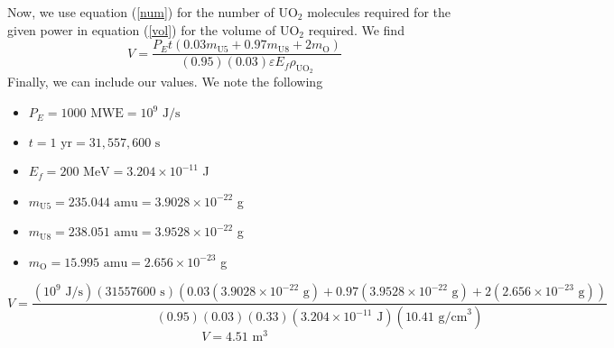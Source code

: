 Now, we use equation (\ref{num}) for the number of UO$_2$ molecules required for the given power in equation (\ref{vol}) for the volume of UO$_2$ required. We find
$$ V = \frac{P_E t(0.03m_{\text{U5}} + 0.97m_{\text{U8}} + 2 m_{\text{O}})}{(0.95)(0.03)\varepsilon E_f\rho_{\text{UO}_2}} $$
Finally, we can include our values. We note the following
\begin{itemize}
\item $P_E = 1000\text{ MWE} = 10^9\text{ J/s}$
\item $t = 1\text{ yr} = 31,557,600\text{ s}$
\item $E_f = 200\text{ MeV} = 3.204 \times 10^{-11}$ J
\item $m_{\text{U5}} = 235.044\text{ amu} = 3.9028 \times 10^{-22}$ g
\item $m_{\text{U8}} = 238.051\text{ amu} = 3.9528 \times 10^{-22}$ g
\item $m_{\text{O}} = 15.995\text{ amu} = 2.656 \times 10^{-23}$ g
\end{itemize}
$$ V = \frac{(10^9\text{ J/s})(31557600\text{ s})(0.03(3.9028 \times 10^{-22}\text{ g}) + 0.97(3.9528 \times 10^{-22}\text{ g}) + 2(2.656 \times 10^{-23}\text{ g}))}{(0.95)(0.03)(0.33)(3.204 \times 10^{-11}\text{ J})(10.41\text{ g/cm}^3)} $$
$$\boxed{ V = 4.51\text{ m}^3 }$$

